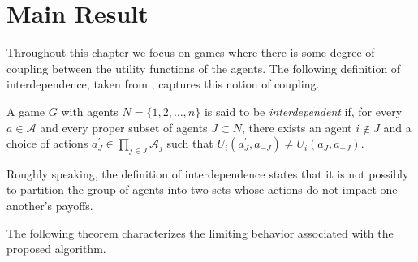\section{Main Result}

Throughout this chapter we focus on games where there is some degree of coupling between the utility functions of the agents.  The following definition of interdependence, taken from \cite{Young2009}, captures this notion of coupling.  
 
\begin{defn}
A game $G$ with agents $N = \{1,2,\ldots,n\}$ is said to be {\it interdependent} if, for every $a\in\mathcal{A}$ and every proper subset of agents $J\subset N$, there exists an agent $i\notin J$ and a choice of actions $a_J^\prime\in\prod_{j\in J} \mathcal{A}_j$ such that $U_i(a_J^\prime,a_{-J})\neq U_i(a_J,a_{-J}).$
\end{defn}

Roughly speaking, the definition of interdependence states that it is not possibly to partition the group of agents into two sets whose actions do not impact one another's payoffs.

The following theorem characterizes the limiting behavior associated with the proposed algorithm. 

\secondtheorem*
%
%
%
%
%
%

\vspace{.1cm}

